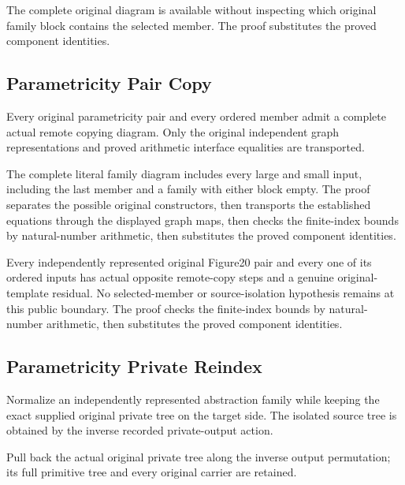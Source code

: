 The complete original diagram is available without inspecting which
original family block contains the selected member.
The proof substitutes the proved component identities.
\par{}

\subsection{Parametricity Pair Copy}
Every original parametricity pair and every ordered member admit a
complete actual remote copying diagram. Only the original independent graph
representations and proved arithmetic interface equalities are transported.

The complete literal family diagram includes every large and small
input, including the last member and a family with either block empty.
The proof separates the possible original constructors, then transports the established equations through the displayed graph maps, then checks the finite-index bounds by natural-number arithmetic, then substitutes the proved component identities.
\par{}

Every independently represented original Figure20 pair and every one of
its ordered inputs has actual opposite remote-copy steps and a genuine
original-template residual. No selected-member or source-isolation hypothesis
remains at this public boundary.
The proof checks the finite-index bounds by natural-number arithmetic, then substitutes the proved component identities.
\par{}

\subsection{Parametricity Private Reindex}
Normalize an independently represented abstraction family while keeping
the exact supplied original private tree on the target side. The isolated
source tree is obtained by the inverse recorded private-output action.

Pull back the actual original private tree along the inverse output
permutation; its full primitive tree and every original carrier are retained.
\par{}

